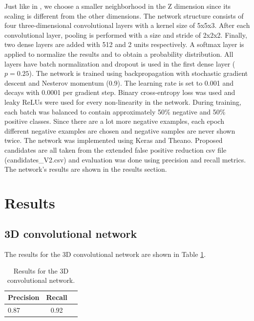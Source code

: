 \documentclass{article}
\begin{document}
Just like in \cite{qidou}, we choose a smaller neighborhood in the Z dimension since its scaling is different from the other dimensions.
The network structure consists of four three-dimensional convolutional layers with a kernel size of 5x5x3.
After each convolutional layer, pooling is performed with a size and stride of 2x2x2.
Finally, two dense layers are added with 512 and 2 units respectively.
A softmax layer is applied to normalize the results and to obtain a probability distribution.
All layers have batch normalization and dropout is used in the first dense layer ($p=0.25$).
The network is trained using backpropagation with stochastic gradient descent and Nesterov momentum (0.9).
The learning rate is set to 0.001 and decays with 0.0001 per gradient step.
Binary cross-entropy loss was used and leaky ReLUs were used for every non-linearity in the network.
During training, each batch was balanced to contain approximately 50\% negative and 50\% positive classes.
Since there are a lot more negative examples, each epoch different negative examples are chosen and negative samples are never shown twice.
The network was implemented using Keras and Theano.
Proposed candidates are all taken from the extended false positive reduction csv file (candidates\_V2.csv) and evaluation was done using precision and recall metrics.
The network's results are shown in the results section.


\section{Results}\label{sec:results}
\subsection{3D convolutional network}
The results for the 3D convolutional network are shown in Table \ref{tbl:results_3d}.
\begin{table}[h!]
	\centering

	\begin{tabular}{l|cc}
	\hline

	\hline
	\textbf{Precision} & \textbf{Recall} \\
	\hline
		 0.87 & 0.92 \\
	\hline

	\hline
	\end{tabular}
	\caption{Results for the 3D convolutional network.}
	\label{tbl:results_3d}
\end{table}
\end{document}
